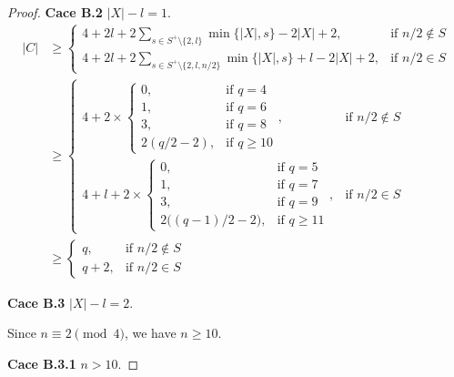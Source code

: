 \documentclass[10pt,a4paper]{amsart}
\begin{document}
\begin{proof}
{\bf Cace B.2}  $|X|- l=1$.
\begin{align*}
|C| &\geq 
\begin{cases}
\displaystyle 4 + 2l+2\sum_{s\in S^+\setminus\{2,l\}} \min\{|X|,s\}-2|X|+2, & \text{if } n/2\notin S \\[4pt]
\displaystyle 4 +2l+ 2\sum_{s\in S^+\setminus\{2,l,n/2\}} \min\{|X|,s\}+ l-2|X|+2, & \text{if } n/2\in S
\end{cases} \\
&\geq 
\begin{cases}
\displaystyle 4 + 2\times
\begin{cases}
0, & \text{if } q=4 \\
1, & \text{if } q=6 \\
3, & \text{if } q=8 \\
2(q/2-2), & \text{if } q\ge 10
\end{cases}, & \text{if } n/2\notin S \\[4pt]
\displaystyle 4+ l + 2\times
\begin{cases}
0, & \text{if } q=5 \\
1, & \text{if } q=7 \\
3, & \text{if } q=9 \\
2\big((q-1)/2-2\big), & \text{if } q\ge 11
\end{cases}, & \text{if } n/2\in S
\end{cases} \\
&\geq 
\begin{cases}
\displaystyle q, & \text{if } n/2\notin S \\[4pt]
\displaystyle q+2, & \text{if } n/2\in S
\end{cases}
\end{align*}

{\bf Cace B.3}  $|X|- l=2$.

Since $n \equiv 2 \pmod{4}$, we have $n \ge 10$.

{\bf Cace B.3.1}  $n>10$.


\end{proof}
\end{document}
